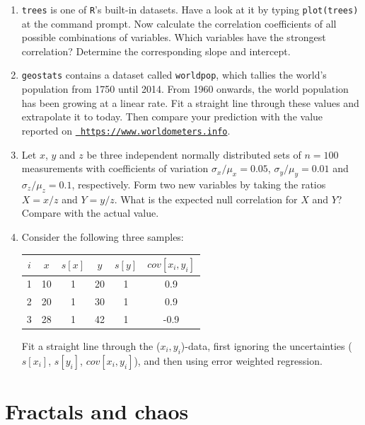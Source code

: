 \begin{enumerate}
\item \texttt{trees} is one of \texttt{R}'s built-in datasets. Have a
  look at it by typing \texttt{plot(trees)} at the command prompt. Now
  calculate the correlation coefficients of all possible combinations
  of variables. Which variables have the strongest correlation?
  Determine the corresponding slope and intercept.

\item \texttt{geostats} contains a dataset called \texttt{worldpop},
  which tallies the world's population from 1750 until 2014.  From
  1960 onwards, the world population has been growing at a linear
  rate. Fit a straight line through these values and extrapolate it to
  today. Then compare your prediction with the value reported on
  \href{https://www.worldometers.info}{\tt
    https://www.worldometers.info}.

\item Let $x$, $y$ and $z$ be three independent normally distributed
  sets of $n=100$ measurements with coefficients of variation
  $\sigma_x/\mu_x=0.05$, $\sigma_y/\mu_y=0.01$ and
  $\sigma_z/\mu_z=0.1$, respectively.  Form two new variables by
  taking the ratios $X=x/z$ and $Y=y/z$. What is the expected null
  correlation for $X$ and $Y$? Compare with the actual value.

\item Consider the following three samples:
\begin{center}
\begin{tabular}{cccccc}
  $i$ & $x$ & $s[x]$ & $y$ & $s[y]$ & $cov[x_i,y_i]$ \\
  \hline
  1 & 10 & 1 & 20 & 1 & 0.9 \\
  2 & 20 & 1 & 30 & 1 & 0.9 \\
  3 & 28 & 1 & 42 & 1 & -0.9
\end{tabular}
\end{center}

Fit a straight line through the ($x_i, y_i$)-data, first ignoring the
uncertainties ($s[x_i]$, $s[y_i]$, $cov[x_i,y_i]$), and then using
error weighted regression.

\end{enumerate}

\section{Fractals and chaos}
\label{sec:ex-fractals}

